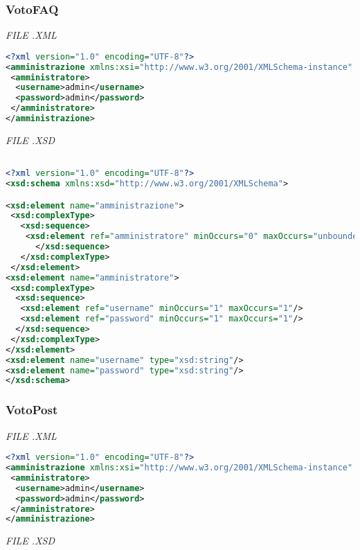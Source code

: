 \documentclass [a4paper,11pt]{book}
\begin{document}
\medskip

\subsubsection{VotoFAQ}

\emph{FILE .XML}

\begin{lstlisting}[language=XML]
<?xml version="1.0" encoding="UTF-8"?>
<amministrazione xmlns:xsi="http://www.w3.org/2001/XMLSchema-instance" xsi:noNamespaceSchemaLocation="amministrazione.xsd">
 <amministratore>
  <username>admin</username>
  <password>admin</password>
 </amministratore>
</amministrazione>
\end{lstlisting}

\emph{FILE .XSD}

\begin{lstlisting}[language=XML]

<?xml version="1.0" encoding="UTF-8"?>
<xsd:schema xmlns:xsd="http://www.w3.org/2001/XMLSchema">

<xsd:element name="amministrazione">
 <xsd:complexType>
   <xsd:sequence>
    <xsd:element ref="amministratore" minOccurs="0" maxOccurs="unbounded" />
      </xsd:sequence>
   </xsd:complexType>
 </xsd:element>
<xsd:element name="amministratore">
 <xsd:complexType>
  <xsd:sequence>
   <xsd:element ref="username" minOccurs="1" maxOccurs="1"/>
   <xsd:element ref="password" minOccurs="1" maxOccurs="1"/>
  </xsd:sequence>
 </xsd:complexType>
</xsd:element>
<xsd:element name="username" type="xsd:string"/>
<xsd:element name="password" type="xsd:string"/>
</xsd:schema>
\end{lstlisting}

\medskip

\subsubsection{VotoPost}

\emph{FILE .XML}

\begin{lstlisting}[language=XML]
<?xml version="1.0" encoding="UTF-8"?>
<amministrazione xmlns:xsi="http://www.w3.org/2001/XMLSchema-instance" xsi:noNamespaceSchemaLocation="amministrazione.xsd">
 <amministratore>
  <username>admin</username>
  <password>admin</password>
 </amministratore>
</amministrazione>
\end{lstlisting}

\emph{FILE .XSD}
\end{document}
